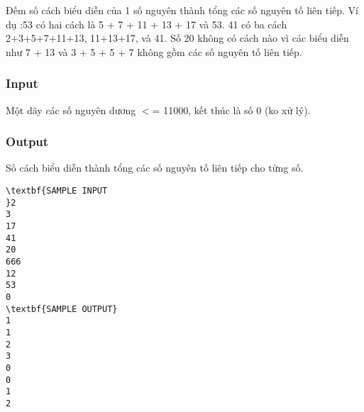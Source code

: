 

Đếm số cách biểu diễn của 1 số nguyên thành tổng các số nguyên tố liên tiếp. Ví dụ :53 có hai cách là 5 + 7 + 11 + 13 + 17 và 53. 41 có ba cách 2+3+5+7+11+13, 11+13+17, và 41. Số 20 không có cách nào vì các biểu diễn như 7 + 13 và 3 + 5 + 5 + 7 không gồm các số nguyên tố liên tiếp.

\subsubsection{Input}

Một dãy các số nguyên dương $<$= 11000, kết thúc là số 0 (ko xử lý).

\subsubsection{Output}

Số cách biểu diễn thành tổng các số nguyên tố liên tiếp cho từng số.
\begin{verbatim}
\textbf{SAMPLE INPUT
}2
3
17
41
20
666
12
53
0
\textbf{SAMPLE OUTPUT}
1
1
2
3
0
0
1
2
\end{verbatim}